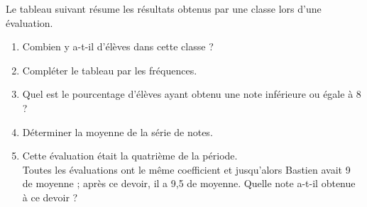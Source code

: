 \begin{exercice*}
   Le tableau suivant résume les résultats obtenus par une classe lors d'une évaluation.
   \begin{center}
   {\small
      }
   \end{center}
   \begin{enumerate}
      \item Combien y a-t-il d'élèves dans cette classe ?
      \item Compléter le tableau par les fréquences.
      \item Quel est le pourcentage d'élèves ayant obtenu une note inférieure ou égale à 8 ?
      \item Déterminer la moyenne de la série de notes.
      \item Cette évaluation était la quatrième de la période. \\
         Toutes les évaluations ont le même coefficient et jusqu'alors Bastien avait 9 de moyenne ; après ce devoir, il a 9,5 de moyenne. Quelle note a-t-il obtenue à ce devoir ? 
   \end{enumerate}
\end{exercice*}

